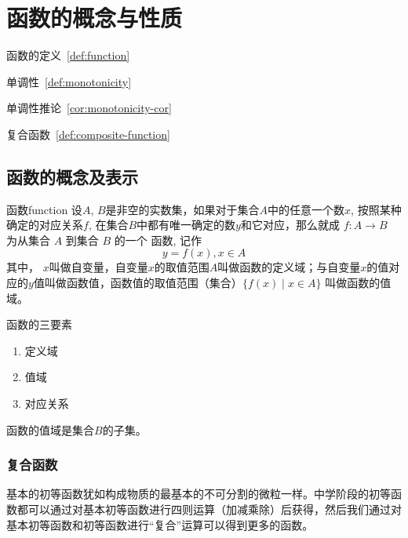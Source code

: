 \chapter{函数的概念与性质}
\label{ch:函数的概念与性质}

\begin{introduction}
\item 函数的定义~\ref{def:function}
\item 单调性~\ref{def:monotonicity}
\item 单调性推论~\ref{cor:monotonicity-cor}
\item 复合函数~\ref{def:composite-function}
\end{introduction}


\section{函数的概念及表示}

\begin{definition}{函数}{function}
设$A$, $B$是非空的实数集，如果对于集合$A$中的\textcolor{third}{任意一个数$x$}, 按照\textcolor{third}{某种确定的对应关系$f$}, 在集合$B$中\textcolor{third}{都有唯一确定的数$y$}和它对应，那么就成 $f: A \rightarrow B$ 为从集合 $A$ 到集合 $B$ 的一个 \textcolor{third}{函数}, 记作
\begin{equation}
y = f(x), x \in A
\end{equation}
其中， $x$叫做\textcolor{third}{自变量}，自变量$x$的取值范围$A$叫做函数的\textcolor{third}{定义域}；与自变量$x$的值对应的$y$\textcolor{third}{值}叫做\textcolor{third}{函数值}，函数值的取值范围（集合）$\{f(x) \mid x \in A \}$ 叫做函数的\textcolor{third}{值域}。
\end{definition}

\begin{note}
函数的三要素
\begin{enumerate}
\item 定义域
\item 值域
\item 对应关系
\end{enumerate}
函数的值域是集合$B$的子集。
\end{note}

\subsection{复合函数}
基本的初等函数犹如构成物质的最基本的不可分割的微粒一样。中学阶段的初等函数都可以通过对基本初等函数进行四则运算（加减乘除）后获得，然后我们通过对基本初等函数和初等函数进行“复合”运算可以得到更多的函数。

